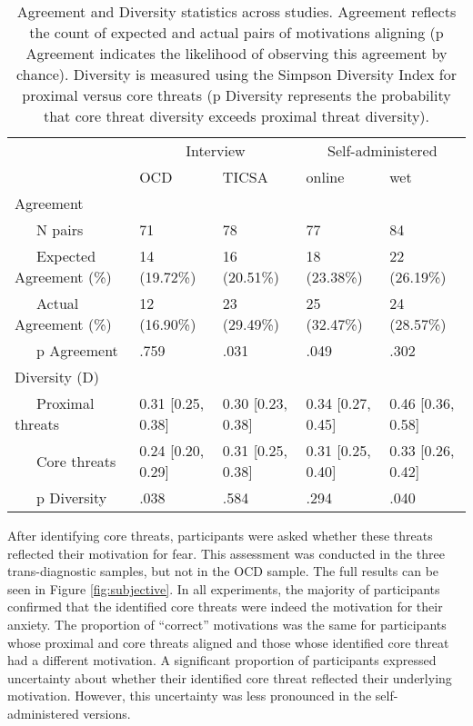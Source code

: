 \documentclass[
  man,floatsintext]{apa7}
\begin{document}
\begin{table}[tbp]

\begin{center}
\begin{threeparttable}

\caption{\label{tab:agreement}Agreement and Diversity statistics across studies. Agreement reflects the count of expected and actual pairs of motivations aligning (p Agreement indicates the likelihood of observing this agreement by chance). Diversity is measured using the Simpson Diversity Index for proximal versus core threats (p Diversity represents the probability that core threat diversity exceeds proximal threat diversity).}

\begin{tabular}{lllll}
\toprule
 & \multicolumn{2}{c}{Interview} & \multicolumn{2}{c}{Self-administered} \\
\cmidrule(r){2-3} \cmidrule(r){4-5}
 & OCD & TICSA & online & wet\\
\midrule
Agreement &  &  &  & \\
\ \ \ N pairs & 71 & 78 & 77 & 84\\
\ \ \ Expected Agreement (\%) & 14 (19.72\%) & 16 (20.51\%) & 18 (23.38\%) & 22 (26.19\%)\\
\ \ \ Actual Agreement (\%) & 12 (16.90\%) & 23 (29.49\%) & 25 (32.47\%) & 24 (28.57\%)\\
\ \ \ p Agreement & .759 & .031 & .049 & .302\\
Diversity (D) &  &  &  & \\
\ \ \ Proximal threats & 0.31 [0.25, 0.38] & 0.30 [0.23, 0.38] & 0.34 [0.27, 0.45] & 0.46 [0.36, 0.58]\\
\ \ \ Core threats & 0.24 [0.20, 0.29] & 0.31 [0.25, 0.38] & 0.31 [0.25, 0.40] & 0.33 [0.26, 0.42]\\
\ \ \ p Diversity & .038 & .584 & .294 & .040\\
\bottomrule
\end{tabular}

\end{threeparttable}
\end{center}

\end{table}

After identifying core threats, participants were asked whether these threats reflected their motivation for fear.
This assessment was conducted in the three trans-diagnostic samples, but not in the OCD sample.
The full results can be seen in Figure \ref{fig:subjective}.
In all experiments, the majority of participants confirmed that the identified core threats were indeed the motivation for their anxiety.
The proportion of ``correct'' motivations was the same for participants whose proximal and core threats aligned and those whose identified core threat had a different motivation.
A significant proportion of participants expressed uncertainty about whether their identified core threat reflected their underlying motivation.
However, this uncertainty was less pronounced in the self-administered versions.
\end{document}
